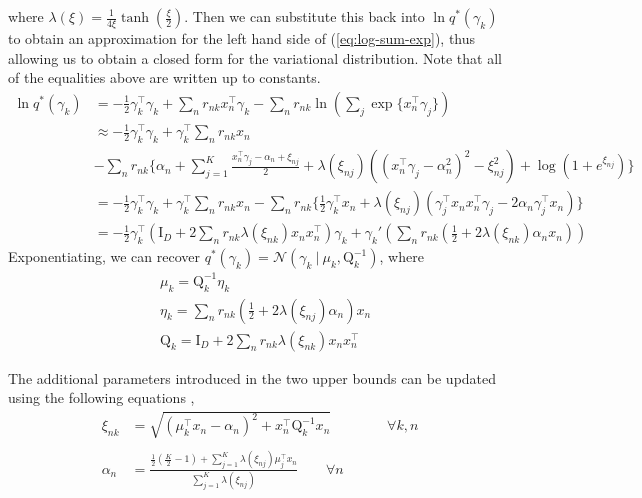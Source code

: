 \documentclass[twoside,11pt]{article}
\newcommand{\tr}{\intercal}
\newcommand{\eye}{\mathrm{I}}
\newcommand\given[1][]{\:#1\vert\:}
\begin{document}
where $\lambda(\xi) = \frac{1}{4\xi} \tanh \left( \frac{\xi}{2} \right)$. Then we can substitute this back into $\ln q^{*}(\gamma_k)$ to obtain an approximation for the left hand side of (\ref{eq:log-sum-exp}), thus allowing us to obtain a closed form for the variational distribution. Note that all of the equalities above are written up to constants.
\begin{align*}
    \ln q^{*}(\gamma_k) &= - \frac{1}{2} \gamma_k^{\tr} \gamma_k + \sum_{n} r_{nk} x_n^{\intercal} \gamma_k  - \sum_n r_{nk} \ln \left( \sum_j \exp\{x_n^{\intercal} \gamma_j \} \right)  \\
    & \approx - \frac{1}{2} \gamma_k^{\tr} \gamma_k + \gamma_k^{\intercal} \sum_{n} r_{nk} x_n \\
    & - \sum_n r_{nk} \Bigg\{ \alpha_n + \sum_{j = 1}^K \frac{x_n^{\intercal} \gamma_j - \alpha_n + \xi_{nj}}{2} + \lambda(\xi_{nj}) \left( (x_n^{\intercal} \gamma_j - \alpha_n^2)^2 - \xi_{nj}^2\right) + \log \left( 1 + e^{\xi_{nj}}\right) \Bigg\} \\
    & = - \frac{1}{2} \gamma_k^{\tr} \gamma_k + \gamma_k^{\intercal} \sum_{n} r_{nk} x_n - \sum_n r_{nk} \Bigg\{ \frac{1}{2} \gamma_k^{\tr} x_n + \lambda\left( \xi_{nj} \right) \left( \gamma_j^{\tr}x_n x_n^{\tr} \gamma_j - 2\alpha_n \gamma_j^{\tr} x_n \right)\Bigg\} \\
    &= -\frac{1}{2} \gamma_k^{\tr} \left(\eye_D  + 2 \sum_n r_{nk} \lambda(\xi_{nk}) x_n x_n^{\tr} \right) \gamma_k + \gamma_k' \left( \sum_n r_{nk} \left(\frac{1}{2} + 2 \lambda \left( \xi_{nk}\right) \alpha_n  x_n\right) \right)
\end{align*}
Exponentiating, we can recover $q^{*}(\gamma_k) = \mathcal{N} \left(\gamma_k \given \mu_k, \mathrm{Q}_k^{-1} \right)$, where
\begin{equation} \label{eq:gamma_params}
\begin{split}
	& \mu_k = \mathrm{Q}_k^{-1} \eta_k \\
	& \eta_k = \sum_{n} r_{nk} \left( \frac{1}{2} + 2 \lambda(\xi_{nj}) \alpha_n \right) x_n \\
	& \mathrm{Q}_k = \eye_D + 2 \sum_{n} r_{nk} \lambda(\xi_{nk}) x_n x_n^{\tr}
\end{split}
\end{equation}

The additional parameters introduced in the two upper bounds can be updated using the following equations \parencite{Depraetere:17},
\begin{align*}
    \xi_{nk} & = \sqrt{\left(\mu_k^{\intercal}x_n - \alpha_n \right)^2 + x_n^{\intercal} \mathrm{Q}_k^{-1} x_n} \qquad \qquad \forall k, n \\ \\
    \alpha_n & = \frac{\frac{1}{2}\left( \frac{K}{2} - 1\right) + \sum_{j = 1}^K \lambda \left( \xi_{nj} \right)\mu_j^{\intercal} x_n}{\sum_{j=1}^{K} \lambda \left( \xi_{nj}\right)} \qquad \forall n
\end{align*}
\end{document}
